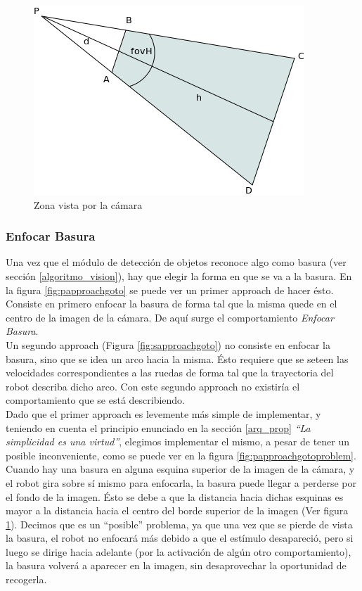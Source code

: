 \begin{figure}[htp]
\begin{center}
\includegraphics[scale=0.5]{comportamientos/rectangleWander.png}
\caption{Zona vista por la c\'amara}
\label{fig:zoneCamera}
\end{center}
\end{figure}

\subsubsection{Enfocar Basura}
\label{focus_garbage}
Una vez que el m\'odulo de detecci\'on de objetos reconoce algo como basura
(ver secci\'on \ref{algoritmo_vision}), hay que elegir
la forma en que se va a la basura. En la figura \ref{fig:papproachgoto} se puede ver un
primer approach de hacer \'esto. Consiste en primero enfocar la basura de forma tal que
la misma quede en el centro de la imagen de la c\'amara. De aqu\'i surge el comportamiento
\emph{Enfocar Basura}.
\\
Un segundo approach (Figura \ref{fig:sapproachgoto}) no consiste en enfocar la basura,
sino que se idea un arco hacia la misma. \'Esto requiere que se seteen las velocidades
correspondientes a las ruedas de forma tal que la trayectoria del robot describa dicho
arco. Con este segundo approach no existir\'ia el comportamiento que se est\'a describiendo.
\\
Dado que el primer approach es levemente m\'as simple de implementar, y teniendo en cuenta el
principio enunciado en la secci\'on \ref{arq_prop} \emph{``La simplicidad es una virtud''},
elegimos implementar el mismo, a pesar de tener un posible inconveniente, como se puede
ver en la figura \ref{fig:papproachgotoproblem}.
\\
Cuando hay una basura en alguna esquina
superior de la imagen de la c\'amara, y el robot gira sobre s\'i mismo para enfocarla,
la basura puede llegar a perderse por el fondo de la imagen. \'Esto se debe a que la distancia
hacia dichas esquinas es mayor a la distancia hacia el centro del borde superior de la imagen
(Ver figura \ref{fig:zoneCamera}). Decimos que es un ``posible'' problema, ya que una vez que se
pierde de vista la basura, el robot no enfocar\'a m\'as debido a que el est\'imulo desapareci\'o,
pero si luego se dirige hacia adelante (por la activaci\'on de alg\'un otro comportamiento), 
la basura volver\'a a aparecer en la imagen, sin desaprovechar la oportunidad de recogerla.

